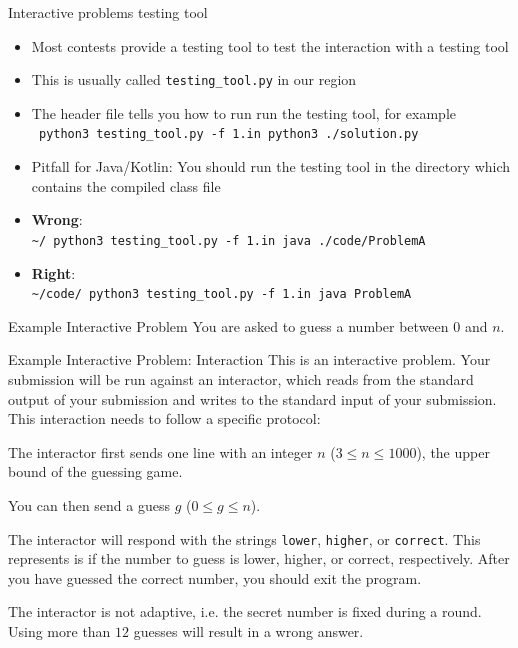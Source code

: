 \documentclass[11pt,pdf, aspectratio=169]{beamer}
\begin{document}
  \begin{frame}{Interactive problems testing tool}
    \begin{itemize}
      \item Most contests provide a testing tool to test the interaction with a testing tool
      \item This is usually called \texttt{testing\_tool.py} in our region
      \item The header file tells you how to run run the testing tool, for example\\\texttt{\textdollar{} python3 testing\_tool.py -f 1.in python3 ./solution.py}
      \item Pitfall for Java/Kotlin: You should run the testing tool in the directory which contains the compiled class file

      \item \textbf{Wrong}:\\\texttt{\textasciitilde/\textdollar{} python3 testing\_tool.py -f 1.in java ./code/ProblemA}
      \item \textbf{Right}:\\\texttt{\textasciitilde/code/\textdollar{} python3 testing\_tool.py -f 1.in java ProblemA}
    \end{itemize}
  \end{frame}
  \begin{frame}{Example Interactive Problem}
    You are asked to guess a number between 0 and $n$.
  \end{frame}
  \begin{frame}{Example Interactive Problem: Interaction}
    This is an interactive problem.
    Your submission will be run against an interactor, which reads from the standard output of your submission and writes to the standard input of your submission.
    This interaction needs to follow a specific protocol:

    The interactor first sends one line with an integer $n$ ($3 \leq n \leq 1000$), the upper bound of the guessing game.

    You can then send a guess $g$ ($0\leq g \leq n$).

    The interactor will respond with the strings \texttt{lower}, \texttt{higher}, or \texttt{correct}.
    This represents is if the number to guess is lower, higher, or correct, respectively.
    After you have guessed the correct number, you should exit the program.

    The interactor is not adaptive, i.e. the secret number is fixed during a round.
    Using more than $12$ guesses will result in a wrong answer.
  \end{frame}
\end{document}
